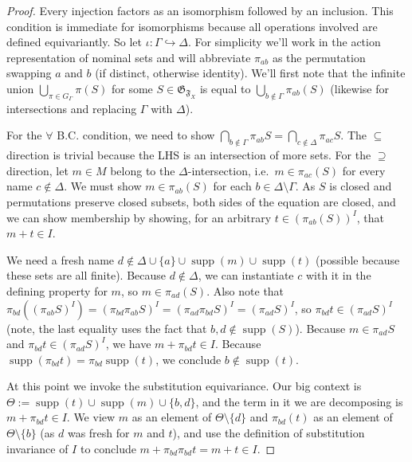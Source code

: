 \documentclass{article}
\theoremstyle{definition}
\newcommand{\F}{\mathfrak{F}}
\newcommand{\G}{\mathfrak{G}}
\newcommand{\supp}{\operatorname{supp}}
\begin{document}
\begin{proof}
    Every injection factors as an isomorphism followed by an inclusion. This condition is immediate for isomorphisms because all operations involved are defined equivariantly. So let $\iota\colon \Gamma \hookrightarrow \Delta$.
    For simplicity we'll work in the action representation of nominal sets and will abbreviate $\pi_{ab}$ as the permutation swapping $a$ and $b$ (if distinct, otherwise identity). We'll first note that the infinite union $\bigcup_{\pi \in G_\Gamma} \pi(S)$ for some $S \in \G_{\F_X}$ is equal to $\bigcup_{b \notin \Gamma} \pi_{ab}(S)$ (likewise for intersections and replacing $\Gamma$ with $\Delta$).

     For the $\forall$ B.C. condition, we need to show $\bigcap_{b \notin \Gamma} \pi_{ab} S=\bigcap_{c \notin \Delta} \pi_{ac} S$. The $\subseteq$ direction is trivial because the LHS is an intersection of more sets. 
     For the $\supseteq$ direction, let $m\in M$ belong to the $\Delta$-intersection,
i.e.\ $m\in\pi_{ac}(S)$ for every name $c\notin\Delta$. We must show
$m\in\pi_{ab}(S)$ for each $b\in\Delta\setminus\Gamma$. As $S$ is closed and
permutations preserve closed subsets, both sides of the equation are closed, and we can show membership by showing, for an arbitrary $t\in(\pi_{ab}(S))^{I}$, that $m+t \in I$. 

We need a fresh name $d \notin \Delta\cup \{a\} \cup \supp(m)\cup \supp(t)$ (possible because these sets are all finite). Because $d \notin \Delta$, we can instantiate $c$ with it in the defining property for $m$, so $m \in \pi_{ad}(S)$. Also note that $\pi_{bd}((\pi_{ab} S)^{I})= (\pi_{bd}\pi_{ab} S)^I = (\pi_{ad} \pi_{bd} S)^I = (\pi_{ad} S)^I$, so $\pi_{bd} t \in (\pi_{ad} S)^I$ (note, the last equality uses the fact that $b,d\notin \supp(S)$). Because $m \in \pi_{ad} S$ and $\pi_{bd} t \in (\pi_{ad} S)^{I}$, we have $m + \pi_{bd} t \in I$. Because $\supp(\pi_{bd} t) = \pi_{bd} \supp(t)$, we conclude $b \notin \supp(t)$. 

At this point we invoke the substitution equivariance. Our big context is $\Theta:=\supp(t)\cup \supp(m) \cup \{b,d\}$, and the term in it we are decomposing is $m+\pi_{bd} t \in I$. We view $m$ as an element of $\Theta\setminus\{d\}$ and $\pi_{bd}(t)$ as an element of $\Theta\setminus\{b\}$ (as $d$ was fresh for $m$ and $t$), and use the definition of substitution invariance of $I$ to conclude $m + \pi_{bd}\pi_{bd} t = m+t \in I$.


\end{proof}
\end{document}
